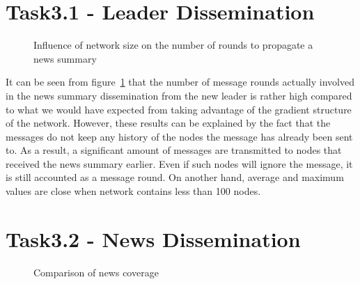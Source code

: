 \documentclass[conference]{IEEEtran}
\begin{document}
\section{Task3.1 - Leader Dissemination}

\begin{figure}
\caption{Influence of network size on the number of rounds to propagate a news summary}
\label{fig:T3_1}
\end{figure}

It can be seen from figure~\ref{fig:T3_1} that the number of message rounds actually involved in the news summary dissemination from the new leader is rather high compared to what we would have expected from taking advantage of the gradient structure of the network. However, these results can be explained by the fact that the messages do not keep any history of the nodes the message has already been sent to. As a result, a significant amount of messages are transmitted to nodes that received the news summary earlier. Even if such nodes will ignore the message, it is still accounted as a message round.
On another hand, average and maximum values are close when network contains less than 100 nodes.

\section{Task3.2 - News Dissemination}

\begin{figure}
\caption{Comparison of news coverage}
\label{fig:T3_2_1}
\end{figure}
\end{document}
